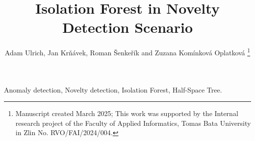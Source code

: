 \documentclass[lettersize,journal]{IEEEtran}
\theoremstyle{definition}
\begin{document}
\title{Isolation Forest in Novelty Detection Scenario}
\author{Adam Ulrich, Jan Krňávek, Roman Šenkeřík and Zuzana Komínková Oplatková
\thanks{Manuscript created March 2025; This work was supported by the Internal research project of the Faculty of Applied Informatics, Tomas Bata University in Zlin No. RVO/FAI/2024/004.}}


\maketitle


\begin{IEEEkeywords}
Anomaly detection, Novelty detection, Isolation Forest, Half-Space Tree.
\end{IEEEkeywords}






% 













% 







\end{document}
